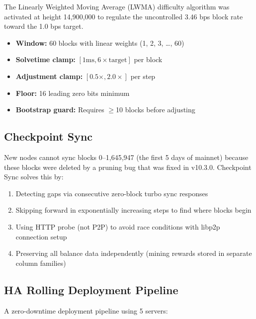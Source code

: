 \documentclass[12pt,a4paper]{article}
\begin{document}
The Linearly Weighted Moving Average (LWMA) difficulty algorithm was activated at height 14{,}900{,}000 to regulate the uncontrolled 3.46 bps block rate toward the 1.0 bps target.

\begin{itemize}
    \item \textbf{Window:} 60 blocks with linear weights (1, 2, 3, \ldots, 60)
    \item \textbf{Solvetime clamp:} $[1\text{ms}, 6 \times \text{target}]$ per block
    \item \textbf{Adjustment clamp:} $[0.5\times, 2.0\times]$ per step
    \item \textbf{Floor:} 16 leading zero bits minimum
    \item \textbf{Bootstrap guard:} Requires $\geq$10 blocks before adjusting
\end{itemize}

\subsection{Checkpoint Sync}

New nodes cannot sync blocks 0--1{,}645{,}947 (the first 5 days of mainnet) because these blocks were deleted by a pruning bug that was fixed in v10.3.0. Checkpoint Sync solves this by:

\begin{enumerate}
    \item Detecting gaps via consecutive zero-block turbo sync responses
    \item Skipping forward in exponentially increasing steps to find where blocks begin
    \item Using HTTP probe (not P2P) to avoid race conditions with libp2p connection setup
    \item Preserving all balance data independently (mining rewards stored in separate column families)
\end{enumerate}

\subsection{HA Rolling Deployment Pipeline}

A zero-downtime deployment pipeline using 5 servers:
\end{document}
